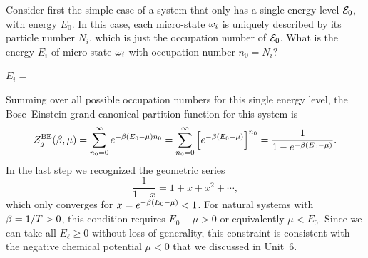 Consider first the simple case of a system that only has a single energy level $\mathcal E_0$, with energy $E_0$.
In this case, each micro-state $\omega_i$ is uniquely described by its particle number $N_i$, which is just the occupation number of $\mathcal E_0$.
What is the energy $E_i$ of micro-state $\omega_i$ with occupation number $n_0 = N_i$?
\begin{mdframed}
  $E_i = $ \\[24 pt]
\end{mdframed}
Summing over all possible occupation numbers for this single energy level, the Bose--Einstein grand-canonical partition function for this system is
\begin{equation}
  \label{eq:BEsingle}
  Z_g^{\text{BE}}(\beta, \mu) = \sum_{n_0 = 0}^{\infty} e^{-\beta (E_0 - \mu) n_0} = \sum_{n_0 = 0}^{\infty} \left[e^{-\beta (E_0 - \mu)}\right]^{n_0} = \frac{1}{1 - e^{-\beta (E_0 - \mu)}}.
\end{equation}
In the last step we recognized the geometric series
\begin{equation*}
  \frac{1}{1 - x} = 1 + x + x^2 + \cdots,
\end{equation*}
which only converges for $x = e^{-\beta (E_0 - \mu)} < 1$.
For natural systems with $\beta = 1 / T > 0$, this condition requires $E_0 - \mu > 0$ or equivalently $\mu < E_0$.
Since we can take all $E_{\ell} \geq 0$ without loss of generality, this constraint is consistent with the negative chemical potential $\mu < 0$ that we discussed in Unit~6.


